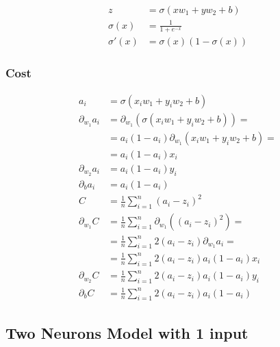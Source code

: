 \documentclass{article}
\begin{document}
\begin{center}
\end{center}
\begin{align}
  z &= \sigma(xw_1 + yw_2 + b) \\
  \sigma(x) &= \frac{1}{1 + e^{-x}} \\
  \sigma'(x) &= \sigma(x)(1 - \sigma(x))
\end{align}

\subsubsection{Cost}

\def\pd[#1]{\partial_{#1}}
\def\avgsum[#1,#2]{\frac{1}{#2}\sum_{#1=1}^{#2}}
\begin{align}
  a_i &= \sigma(x_iw_1 + y_iw_2 + b) \\
  \pd[w_1]a_i
  &= \pd[w_1](\sigma(x_iw_1 + y_iw_2 + b)) = \\
  &= a_i(1 - a_i)\pd[w_1](x_iw_1 + y_iw_2 + b) = \\
  &= a_i(1 - a_i)x_i \\
  \pd[w_2]a_i &= a_i(1 - a_i)y_i \\
  \pd[b]a_i &= a_i(1 - a_i) \\
  C &= \avgsum[i, n](a_i - z_i)^2 \\
  \pd[w_1] C
  &= \avgsum[i, n]\pd[w_1]\left((a_i - z_i)^2\right) = \\
  &= \avgsum[i, n]2(a_i - z_i)\pd[w_1]a_i = \\
  &= \avgsum[i, n]2(a_i - z_i)a_i(1 - a_i)x_i \\
  \pd[w_2] C &= \avgsum[i, n]2(a_i - z_i)a_i(1 - a_i)y_i \\
  \pd[b] C &= \avgsum[i, n]2(a_i - z_i)a_i(1 - a_i)
\end{align}

\subsection{Two Neurons Model with 1 input}

\begin{center}
\end{center}
\end{document}
